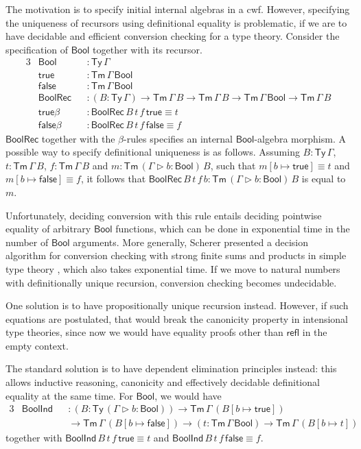 \documentclass[12pt,a4paper,twoside,openany]{book}
\theoremstyle{remark}
\theoremstyle{definition}
\theoremstyle{theorem}
\newcommand{\ms}[1]{\mathsf{#1}}
\newcommand{\refl}{\mathsf{refl}}
\newcommand{\Tm}{\mathsf{Tm}}
\newcommand{\Ty}{\mathsf{Ty}}
\newcommand{\ext}{\triangleright}
\newcommand{\Bool}{\ms{Bool}}
\newcommand{\true}{\ms{true}}
\newcommand{\false}{\ms{false}}
\begin{document}
The motivation is to specify initial internal algebras in a cwf. However,
specifying the uniqueness of recursors using definitional equality is
problematic, if we are to have decidable and efficient conversion checking for a
type theory. Consider the specification of $\Bool$ together with its recursor.
\begin{alignat*}{3}
  & \Bool  &&: \Ty\,\Gamma \\
  & \true  &&: \Tm\,\Gamma\,\Bool \\
  & \false &&: \Tm\,\Gamma\,\Bool \\
  & \ms{BoolRec} &&: (B : \Ty\,\Gamma)\to \Tm\,\Gamma\,B \to \Tm\,\Gamma\,B \to \Tm\,\Gamma\,\Bool \to \Tm\,\Gamma\,B\\
  & \true\beta &&: \ms{BoolRec}\,B\,t\,f\,\true \equiv t\\
  & \false\beta &&: \ms{BoolRec}\,B\,t\,f\,\false \equiv f
\end{alignat*}
$\ms{BoolRec}$ together with the $\beta$-rules specifies an internal
$\Bool$-algebra morphism. A possible way to specify definitional uniqueness is
as follows. Assuming $B : \Ty\,\Gamma$, $t : \Tm\,\Gamma\,B$, $f :
\Tm\,\Gamma\,B$ and $m : \Tm\,(\Gamma\ext b : \Bool)\,B$, such that $m[b \mapsto
  \true] \equiv t$ and $m[b \mapsto \false] \equiv f$, it follows that
$\ms{BoolRec}\,B\,t\,f\,b : \Tm\,(\Gamma\ext b : \Bool)\,B$ is equal to $m$.

Unfortunately, deciding conversion with this rule entails deciding pointwise
equality of arbitrary $\Bool$ functions, which can be done in exponential time
in the number of $\Bool$ arguments. More generally, Scherer presented a decision
algorithm for conversion checking with strong finite sums and products in simple
type theory \cite{scherer17deciding}, which also takes exponential time. If we
move to natural numbers with definitionally unique recursion, conversion
checking becomes undecidable.

One solution is to have propositionally unique recursion instead. However, if
such equations are postulated, that would break the canonicity property in
intensional type theories, since now we would have equality proofs other than
$\refl$ in the empty context.

The standard solution is to have dependent elimination principles instead: this
allows inductive reasoning, canonicity and effectively decidable definitional
equality at the same time. For $\Bool$, we would have
\begin{alignat*}{3}
  & \ms{BoolInd} &&: (B : \Ty\,(\Gamma\ext b : \Bool)) \to \Tm\,\Gamma\,(B[b \mapsto \true])\\
  & &&\to \Tm\,\Gamma\,(B[b \mapsto \false]) \to (t : \Tm\,\Gamma\,\Bool) \to \Tm\,\Gamma\,(B[b \mapsto t])
\end{alignat*}
together with $\ms{BoolInd}\,B\,t\,f\,\true \equiv t$ and $\ms{BoolInd}\,B\,t\,f\,\false \equiv f$.
\end{document}
